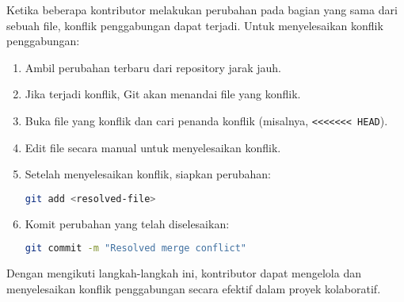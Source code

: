 Ketika beberapa kontributor melakukan perubahan pada bagian yang sama dari sebuah file, konflik penggabungan dapat terjadi. Untuk menyelesaikan konflik penggabungan:

\begin{enumerate}
	\item Ambil perubahan terbaru dari repository jarak jauh.
	\item Jika terjadi konflik, Git akan menandai file yang konflik.
	\item Buka file yang konflik dan cari penanda konflik (misalnya, \texttt{<<<<<<< HEAD}).
	\item Edit file secara manual untuk menyelesaikan konflik.
	\item Setelah menyelesaikan konflik, siapkan perubahan:
	\begin{lstlisting}[language=bash]
		git add <resolved-file>
	\end{lstlisting}
	\item Komit perubahan yang telah diselesaikan:
	\begin{lstlisting}[language=bash]
		git commit -m "Resolved merge conflict"
	\end{lstlisting}
\end{enumerate}

Dengan mengikuti langkah-langkah ini, kontributor dapat mengelola dan menyelesaikan konflik penggabungan secara efektif dalam proyek kolaboratif.


